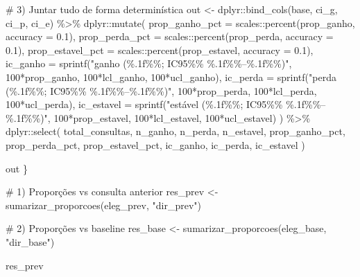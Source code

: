 \documentclass[
]{article}
\newenvironment{Shaded}{\begin{snugshade}}{\end{snugshade}}
\newcommand{\AttributeTok}[1]{\textcolor[rgb]{0.40,0.45,0.13}{#1}}
\newcommand{\CommentTok}[1]{\textcolor[rgb]{0.37,0.37,0.37}{#1}}
\newcommand{\DecValTok}[1]{\textcolor[rgb]{0.68,0.00,0.00}{#1}}
\newcommand{\FloatTok}[1]{\textcolor[rgb]{0.68,0.00,0.00}{#1}}
\newcommand{\FunctionTok}[1]{\textcolor[rgb]{0.28,0.35,0.67}{#1}}
\newcommand{\NormalTok}[1]{\textcolor[rgb]{0.00,0.23,0.31}{#1}}
\newcommand{\OtherTok}[1]{\textcolor[rgb]{0.00,0.23,0.31}{#1}}
\newcommand{\SpecialCharTok}[1]{\textcolor[rgb]{0.37,0.37,0.37}{#1}}
\newcommand{\StringTok}[1]{\textcolor[rgb]{0.13,0.47,0.30}{#1}}
\begin{document}
\begin{Shaded}
\begin{Highlighting}[]
  \CommentTok{\# 3) Juntar tudo de forma determinística}
\NormalTok{  out }\OtherTok{\textless{}{-}}\NormalTok{ dplyr}\SpecialCharTok{::}\FunctionTok{bind\_cols}\NormalTok{(base, ci\_g, ci\_p, ci\_e) }\SpecialCharTok{\%\textgreater{}\%}
\NormalTok{    dplyr}\SpecialCharTok{::}\FunctionTok{mutate}\NormalTok{(}
      \AttributeTok{prop\_ganho\_pct   =}\NormalTok{ scales}\SpecialCharTok{::}\FunctionTok{percent}\NormalTok{(prop\_ganho,   }\AttributeTok{accuracy =} \FloatTok{0.1}\NormalTok{),}
      \AttributeTok{prop\_perda\_pct   =}\NormalTok{ scales}\SpecialCharTok{::}\FunctionTok{percent}\NormalTok{(prop\_perda,   }\AttributeTok{accuracy =} \FloatTok{0.1}\NormalTok{),}
      \AttributeTok{prop\_estavel\_pct =}\NormalTok{ scales}\SpecialCharTok{::}\FunctionTok{percent}\NormalTok{(prop\_estavel, }\AttributeTok{accuracy =} \FloatTok{0.1}\NormalTok{),}
      \AttributeTok{ic\_ganho   =} \FunctionTok{sprintf}\NormalTok{(}\StringTok{"ganho (\%.1f\%\%; IC95\%\% \%.1f\%\%–\%.1f\%\%)"}\NormalTok{,}
                           \DecValTok{100}\SpecialCharTok{*}\NormalTok{prop\_ganho, }\DecValTok{100}\SpecialCharTok{*}\NormalTok{lcl\_ganho, }\DecValTok{100}\SpecialCharTok{*}\NormalTok{ucl\_ganho),}
      \AttributeTok{ic\_perda   =} \FunctionTok{sprintf}\NormalTok{(}\StringTok{"perda (\%.1f\%\%; IC95\%\% \%.1f\%\%–\%.1f\%\%)"}\NormalTok{,}
                           \DecValTok{100}\SpecialCharTok{*}\NormalTok{prop\_perda, }\DecValTok{100}\SpecialCharTok{*}\NormalTok{lcl\_perda, }\DecValTok{100}\SpecialCharTok{*}\NormalTok{ucl\_perda),}
      \AttributeTok{ic\_estavel =} \FunctionTok{sprintf}\NormalTok{(}\StringTok{"estável (\%.1f\%\%; IC95\%\% \%.1f\%\%–\%.1f\%\%)"}\NormalTok{,}
                           \DecValTok{100}\SpecialCharTok{*}\NormalTok{prop\_estavel, }\DecValTok{100}\SpecialCharTok{*}\NormalTok{lcl\_estavel, }\DecValTok{100}\SpecialCharTok{*}\NormalTok{ucl\_estavel)}
\NormalTok{    ) }\SpecialCharTok{\%\textgreater{}\%}
\NormalTok{    dplyr}\SpecialCharTok{::}\FunctionTok{select}\NormalTok{(}
\NormalTok{      total\_consultas,}
\NormalTok{      n\_ganho, n\_perda, n\_estavel,}
\NormalTok{      prop\_ganho\_pct, prop\_perda\_pct, prop\_estavel\_pct,}
\NormalTok{      ic\_ganho, ic\_perda, ic\_estavel}
\NormalTok{    )}

\NormalTok{  out}
\NormalTok{\}}

\CommentTok{\# 1) Proporções vs consulta anterior}
\NormalTok{res\_prev }\OtherTok{\textless{}{-}} \FunctionTok{sumarizar\_proporcoes}\NormalTok{(eleg\_prev, }\StringTok{"dir\_prev"}\NormalTok{)}

\CommentTok{\# 2) Proporções vs baseline}
\NormalTok{res\_base }\OtherTok{\textless{}{-}} \FunctionTok{sumarizar\_proporcoes}\NormalTok{(eleg\_base, }\StringTok{"dir\_base"}\NormalTok{)}

\NormalTok{res\_prev}
\end{Highlighting}
\end{Shaded}
\end{document}
